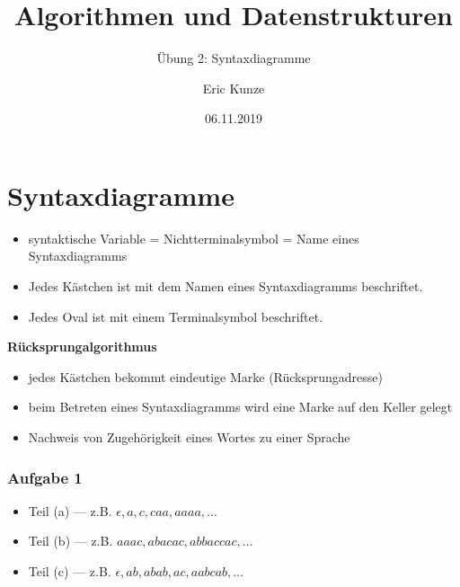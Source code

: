 \documentclass{beamer}
\begin{document}
	
	\title{Algorithmen und Datenstrukturen}
	\subtitle{Übung 2: Syntaxdiagramme}
	\author{Eric Kunze}
	\date{06.11.2019}

	\maketitle



\section{Syntaxdiagramme}

\begin{frame}
	\begin{itemize}
		\item syntaktische Variable = Nichtterminalsymbol = Name eines Syntaxdiagramms
		\item Jedes Kästchen ist mit dem Namen eines Syntaxdiagramms beschriftet.
		\item Jedes Oval ist mit einem Terminalsymbol beschriftet.
	\end{itemize}

	\pause

	\textbf{Rücksprungalgorithmus}
	\begin{itemize}
		\item jedes Kästchen bekommt eindeutige Marke (Rücksprungadresse)
		\item beim Betreten eines Syntaxdiagramms wird eine Marke auf den Keller gelegt
		\item Nachweis von Zugehörigkeit eines Wortes zu einer Sprache
	\end{itemize}
\end{frame}

\begin{frame} \frametitle{Aufgabe 1}
	\begin{itemize}
		\item Teil (a) ---
		z.B. $\epsilon, a, c, caa, aaaa, \dots$
		\item Teil (b) ---
		z.B. $aaac, abacac, abbaccac, \dots$
		\item 	Teil (c) ---
		z.B. $\epsilon, ab, abab, ac, aabcab, \dots$
	\end{itemize}
\end{frame}
\end{document}
